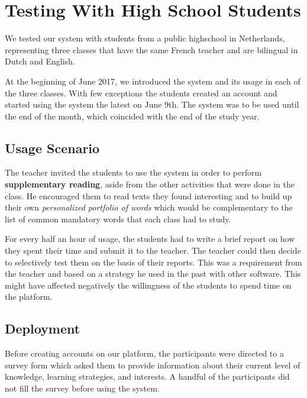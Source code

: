 
\newpage
\section{Testing With High School Students}
\label{sec:demographics}

We tested our system with \stcnt students from a public highschool in Netherlands, representing three classes that have the same French teacher and are bilingual in Dutch and English. 

At the beginning of June 2017, we introduced the system and its usage in each of the three classes. With few exceptions the students created an account and started using the system the latest on June 9th. The system was to be used until the end of the month, which coincided with the end of the study year. 

\begin{added}
\subsection{Usage Scenario}



	The teacher invited the students to use the system in order to perform {\bf supplementary reading}, aside from the other activities that were done in the class. He encouraged them to read texts they found interesting and to build up their own {\em personalized portfolio of words} which would be complementary to the list of common mandatory words that each class had to study.
	
	For every half an hour of usage, the students had to write a brief report on how they spent their time and submit it to the teacher. The teacher could then decide to selectively test them on the basis of their reports. This was a requirement from the teacher and based on a strategy he used in the past with other software. This might have affected negatively the willingness of the students to spend time on the platform.
\end{added}


\subsection{Deployment}

Before creating accounts on our platform, the participants were directed to a survey form which asked them to provide information about their current level of knowledge, learning strategies, and interests. A handful of the participants did not fill the survey before using the system.

